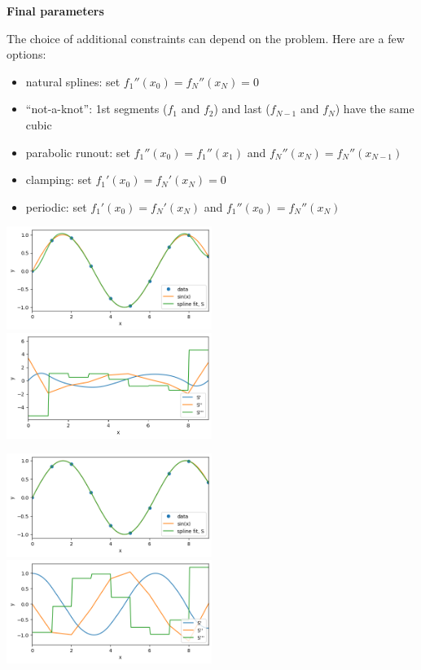 \documentclass[12pt,letterpaper,noanswers]{exam}
\begin{document}
\noindent\textbf{Final parameters}
\begin{tcolorbox}
The choice of additional constraints can depend on the problem.  Here are a few options:
\begin{itemize}
\itemsep0pt
    \item natural splines: set $f_1''(x_0) = f_N''(x_N) = 0$
    \item ``not-a-knot'': 1st segments ($f_1$ and $f_2$) and last ($f_{N-1}$ and $f_N$) have the same cubic
    \item parabolic runout: set $f_1''(x_0) = f_1''(x_1)$ and $f_N''(x_N) = f_N''(x_{N-1})$
    \item clamping: set $f_1'(x_0) = f_N'(x_N) = 0$
    \item periodic: set $f_1'(x_0) = f_N'(x_N)$ and $f_1''(x_0) = f_N''(x_N)$
\end{itemize}
\end{tcolorbox}

\includegraphics[width=0.5\textwidth]{img/Class09clamp.png}
\includegraphics[width=0.5\textwidth]{img/Class09clampderiv.png}

\includegraphics[width=0.5\textwidth]{img/Class09natural.png}
\includegraphics[width=0.5\textwidth]{img/Class09naturalderiv.png}
\end{document}
